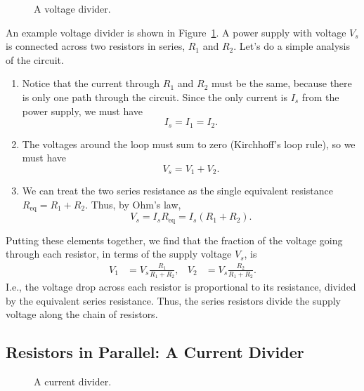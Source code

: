\documentclass[addpoints]{physlabs}
\begin{document}
\begin{labsection}
\begin{theory}
\begin{figure}
    \centering
    
    \caption{A voltage divider.}
    \label{fig: voltage divider}
\end{figure}

An example voltage divider is shown in Figure~\ref{fig: voltage divider}. A power supply with voltage $V_s$ is connected across two resistors in series, $R_1$ and $R_2$. Let's do a simple analysis of the circuit.

\begin{enumerate}
    \item Notice that the current through $R_1$ and $R_2$ must be the same, because there is only one path through the circuit. Since the only current is $I_s$ from the power supply, we must have
    \[
        I_s = I_1 = I_2.
    \]

    \item The voltages around the loop must sum to zero (Kirchhoff's loop rule), so we must have
    \[
        V_s = V_1 + V_2.
    \]

    \item We can treat the two series resistance as the single equivalent resistance $R_\text{eq}=R_1+R_2$. Thus, by Ohm's law,
    \[
        V_s = I_s R_\text{eq} = I_s(R_1 + R_2).
    \]
\end{enumerate}
%
Putting these elements together, we find that the fraction of the voltage going through each resistor, in terms of the supply voltage $V_s$, is
%
\begin{align}\label{eq: voltage divider}
    V_1 &= V_s\frac{R_1}{R_1+R_2},
    &
    V_2 &= V_s\frac{R_2}{R_1+R_2}.
\end{align}
%
I.e., the voltage drop across each resistor is proportional to its resistance, divided by the equivalent series resistance. Thus, the series resistors divide the supply voltage along the chain of resistors.

\subsection*{Resistors in Parallel: A Current Divider}

\begin{figure}
    \centering
    
    \caption{A current divider.}
    \label{fig: current divider}
\end{figure}


\end{theory}
\end{labsection}
\end{document}
